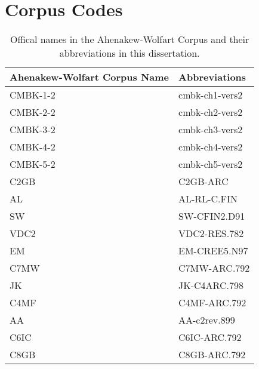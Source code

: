 \chapter{Corpus Codes}
\label{a:corpcode}
\begin{table}
  \centering
  \begin{tabular}{ll}
    \toprule
     Ahenakew-Wolfart Corpus Name & Abbreviations           \\
    \midrule
    CMBK-1-2 & cmbk-ch1-vers2 \\
    CMBK-2-2 & cmbk-ch2-vers2 \\
    CMBK-3-2 & cmbk-ch3-vers2 \\
    CMBK-4-2 & cmbk-ch4-vers2 \\
    CMBK-5-2 & cmbk-ch5-vers2 \\
    C2GB & C2GB-ARC \\
    AL & AL-RL-C.FIN \\
    SW & SW-CFIN2.D91 \\
    VDC2 & VDC2-RES.782 \\
    EM & EM-CREE5.N97 \\
    C7MW & C7MW-ARC.792 \\
    JK & JK-C4ARC.798 \\
    C4MF & C4MF-ARC.792 \\
    AA & AA-c2rev.899 \\
    C6IC & C6IC-ARC.792 \\
    C8GB & C8GB-ARC.792 \\
    
    \bottomrule
  \end{tabular}
  \caption{
    Offical names in the Ahenakew-Wolfart Corpus and their abbreviations in this dissertation. \label{Tab:CorpusCodes}
  }
\end{table}
